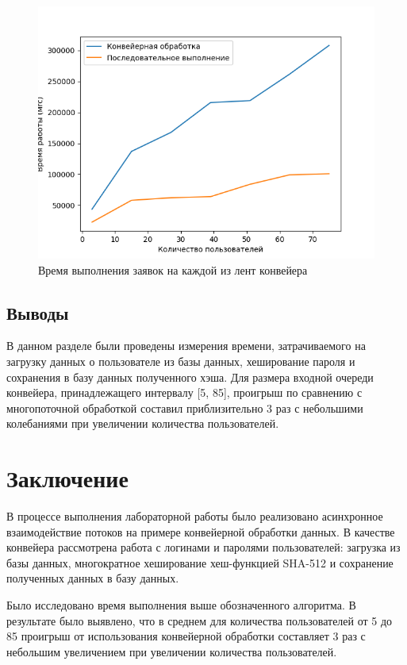 \documentclass[a4paper,oneside,14pt]{extreport}
\begin{document}
\captionsetup{singlelinecheck=true}
\begin{figure}[H]
	\centering
	\includegraphics[width=0.65\linewidth]{images/maxmintime}
	\caption{Время выполнения заявок на каждой из лент конвейера}
	\label{fig:maxmintime}
\end{figure}


\section{Выводы}
В данном разделе были проведены измерения времени, затрачиваемого на загрузку данных о пользователе из базы данных, хеширование пароля и сохранения в базу данных полученного хэша.
Для размера входной очереди конвейера, принадлежащего интервалу [5, 85], проигрыш по сравнению с многопоточной обработкой составил приблизительно 3 раз с небольшими колебаниями при увеличении количества пользователей.
\newpage

\chapter*{Заключение}
В процессе выполнения лабораторной работы было реализовано асинхронное взаимодействие потоков на примере конвейерной обработки данных. В качестве конвейера рассмотрена работа с логинами и паролями пользователей: загрузка из базы данных, многократное хеширование хеш-функцией SHA-512 и сохранение полученных данных в базу данных.

Было исследовано время выполнения выше обозначенного алгоритма. В результате было выявлено, что в среднем для количества пользователей от 5 до 85 проигрыш от использования конвейерной обработки составляет 3 раз с небольшим увеличением при увеличении количества пользователей.

\newpage
{}



\nocite{*}
\end{document}
